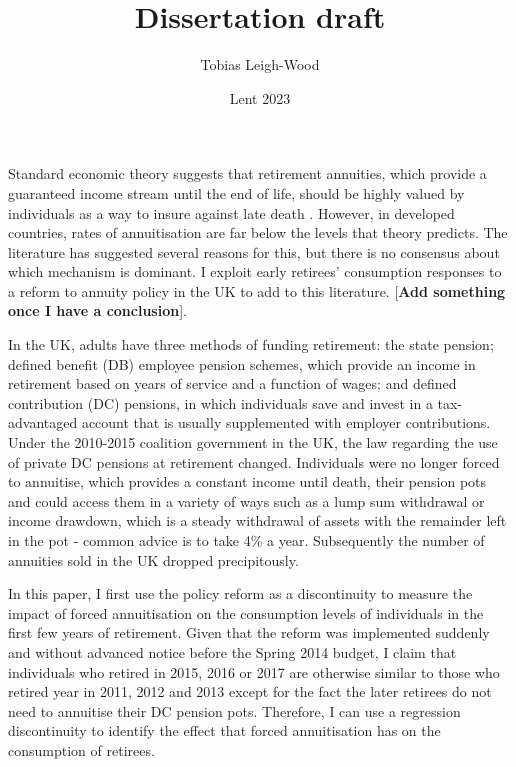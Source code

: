 \documentclass[12pt]{article}
\date{Lent 2023}
\title{Dissertation draft}
\author{Tobias Leigh-Wood}
\begin{document}
\maketitle
\tableofcontents
\newpage

Standard economic theory suggests that retirement annuities, which provide a guaranteed income stream until the end of life,
should be highly valued by individuals as a way to insure against late death \cite{yaari_65}. However, in developed countries,
rates of annuitisation are far below the levels that theory predicts. The literature has suggested several reasons for
this, but there is no consensus about which mechanism is dominant. I exploit early retirees' consumption responses to a
reform to annuity policy in the UK to add to this literature.
    [\textbf{Add something once I have a conclusion}].

In the UK, adults have three methods of funding retirement: the state pension; defined benefit (DB) employee pension schemes,
which provide an income in retirement based on years of service and a function of wages; and defined contribution (DC) pensions,
in which individuals save and invest in a tax-advantaged account that is usually supplemented with employer contributions.
Under the 2010-2015 coalition government in the UK, the law regarding the use of private DC pensions at
retirement changed. Individuals were no longer forced to annuitise, which provides a constant income until death,
their pension pots and could access them in a variety of ways such as a lump sum withdrawal or income drawdown,
which is a steady withdrawal of assets
with the remainder left in the pot - common advice is to take 4\% a year.
Subsequently the number of annuities sold in the UK dropped precipitously.

In this paper, I first use the policy reform as a discontinuity to measure the impact of forced annuitisation on the consumption
levels of individuals in the first few years of retirement. Given that the reform was implemented suddenly and without
advanced notice before the Spring 2014 budget, I claim that individuals who retired in 2015, 2016 or 2017
are otherwise similar to those who retired year in 2011, 2012 and 2013 except for the fact the later retirees
do not need to annuitise their DC pension pots. Therefore, I can use a regression discontinuity to identify
the effect that forced annuitisation has on the consumption of retirees.
\end{document}
